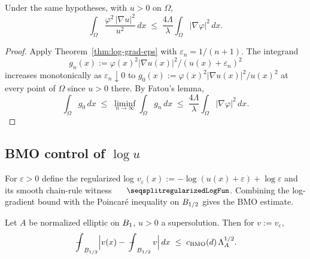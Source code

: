 \begin{theorem}
\label{thm:log-grad}
\leanok
{}
Under the same hypotheses, with $u > 0$ on $\Omega$,
\begin{equation*}
  \int_\Omega \frac{\varphi^2\,|\nabla u|^2}{u^2}\,dx
    \;\leq\; \frac{4\Lambda}{\lambda}\int_\Omega |\nabla\varphi|^2\,dx.
\end{equation*}
\end{theorem}

\begin{proof}
\leanok
{}

Apply Theorem~\ref{thm:log-grad-eps} with $\varepsilon_n = 1/(n+1)$. The
integrand
\begin{equation*}
  g_n(x) := \varphi(x)^2|\nabla u(x)|^2/(u(x)+\varepsilon_n)^2
\end{equation*}
increases monotonically as $\varepsilon_n \downarrow 0$ to
$g_0(x) := \varphi(x)^2|\nabla u(x)|^2/u(x)^2$ at every point of $\Omega$
since $u > 0$ there. By Fatou's lemma,
\begin{equation*}
  \int_\Omega g_0\,dx \;\leq\; \liminf_{n\to\infty}\int_\Omega g_n\,dx
    \;\leq\; \frac{4\Lambda}{\lambda}\int_\Omega |\nabla\varphi|^2\,dx.
\end{equation*}
\end{proof}

\subsection{BMO control of \texorpdfstring{$\log u$}{log u}}

For $\varepsilon > 0$ define the regularized log
$v_\varepsilon(x) := -\log(u(x)+\varepsilon) + \log\varepsilon$ and its smooth
chain-rule witness $\leanname{regularizedLogFun}$. Combining the log-gradient
bound with the Poincar\'e inequality on $B_{1/2}$ gives the BMO estimate.

\begin{theorem}
\label{thm:bmo-half}
\leanok
{}
Let $A$ be normalized elliptic on $B_{1}$, $u > 0$ a supersolution. Then
for $v := v_\varepsilon$,
\begin{equation*}
  \fint_{\Bz{1/2}} \Bigl|v(x) - \fint_{\Bz{1/2}} v\Bigr|\,dx
    \;\leq\; c_{\BMO}(d)\,\Lambda_A^{1/2}.
\end{equation*}
\end{theorem}

